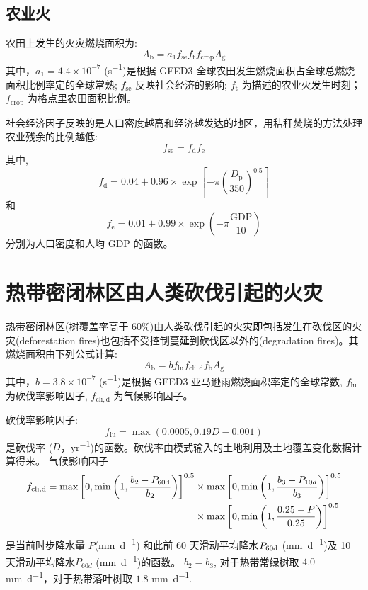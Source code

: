 \subsection{农业火}

农田上发生的火灾燃烧面积为:
\begin{equation}
  A_{\mathrm{b}}=a_{1} f_{\mathrm{s e}} f_{\mathrm{t}} f_{\mathrm{c r o p}} A_{\mathrm{g}}
\end{equation}
%
其中，$a_{1} =4.4\times10^{-7}$ (\unit{s^{-1}})是根据 GFED3 全球农田发生燃烧面积占全球总燃烧面积比例率定的全球常熟; $f_{\mathrm{se}}$ 反映社会经济的影响; $f_{\mathrm {t}} $ 为描述的农业火发生时刻；$f_{\mathrm{crop}}$ 为格点里农田面积比例。


社会经济因子反映的是人口密度越高和经济越发达的地区，用秸秆焚烧的方法处理农业残余的比例越低:
\begin{equation}
  f_{\mathrm{se}} = f_{\mathrm {d}}  f_{\mathrm {e}}
\end{equation}
其中,
\begin{equation}
  f_{\mathrm{d}}=0.04+0.96 \times \exp \left[-\pi\left(\frac{D_{\mathrm{p}}}{350}\right)^{0.5}\right]
\end{equation}
和
\begin{equation}
  f_{\mathrm{e}}=0.01+0.99 \times \exp \left(-\pi \frac{\text{GDP}}{10}\right)
\end{equation}
分别为人口密度和人均 GDP 的函数。


\section{热带密闭林区由人类砍伐引起的火灾}
热带密闭林区(树覆盖率高于 60\%)由人类砍伐引起的火灾即包括发生在砍伐区的火灾(deforestation fires)也包括不受控制蔓延到砍伐区以外的(degradation fires)。其燃烧面积由下列公式计算:
\begin{equation}
  A_{\mathrm{b}}=b f_{\mathrm{l u}} f_{\mathrm{c l i, d}} f_{\mathrm{b}} A_{\mathrm{g}}
\end{equation}
%
其中，$b =3.8\times10^{-7}$ (\unit{s^{-1}})是根据 GFED3 亚马逊雨燃烧面积率定的全球常数, $f_{\mathrm{lu}}$ 为砍伐率影响因子, $f_{\mathrm{cli,d}}$ 为气候影响因子。

砍伐率影响因子:
\begin{equation}
  f_{\mathrm{lu}} = \max(0.0005, 0.19D - 0.001)
\end{equation}
是砍伐率 ($D$，\unit{yr^{-1}})的函数。砍伐率由模式输入的土地利用及土地覆盖变化数据计算得来。
气候影响因子
\begin{equation}
  \begin{aligned}
    f_{\mathrm{c l i, d}}=\max\left[0, \min \left(1, \frac{b_{2}-P_{\rm 60d}}{b_{2}}\right)\right]^{0.5}& \times\max\left[0, \min \left(1, \frac{b_{3}-P_{10 d}}{b_{3}}\right)\right]^{0.5}\\
    & \times\max\left[0, \min \left(1, \frac{0.25-P}{0.25}\right)\right]^{0.5}
  \end{aligned}
\end{equation}
是当前时步降水量 $P$(\unit{mm.d^{-1}}) 和此前 60 天滑动平均降水$P_{\rm 60d}$ (\unit{mm.d^{-1}})及 10 天滑动平均降水$P_{60 d}$ (\unit{mm.d^{-1}})的函数。 $b_2 = b_3$, 对于热带常绿树取 $4.0$ \unit{mm.d^{-1}}，对于热带落叶树取 $1.8$ \unit{mm.d^{-1}}.


